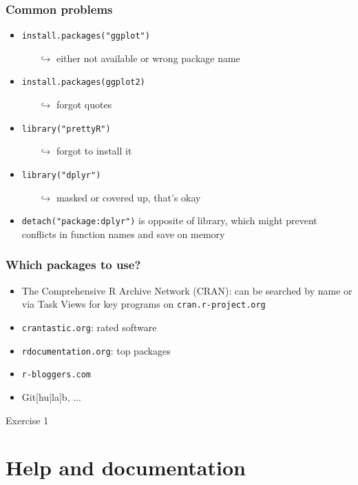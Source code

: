 \documentclass[xcolor={svgnames},10pt,
handout
]{beamer}
\begin{document}
\begin{frame}[fragile]
\frametitle{Common problems}
\begin{itemize}
\item \lstinline|install.packages("ggplot")|
	\begin{itemize}
	\item[$\hookrightarrow$] either not available or wrong package name 
	\end{itemize}
\item \lstinline|install.packages(ggplot2)|
	\begin{itemize}
	\item[$\hookrightarrow$] forgot quotes
	\end{itemize}
\item \lstinline|library("prettyR")|
	\begin{itemize}
	\item[$\hookrightarrow$] forgot to install it
	\end{itemize}
\item \lstinline|library("dplyr")|
	\begin{itemize}
	\item[$\hookrightarrow$] masked or covered up, that's okay
	\end{itemize}
\item \lstinline|detach("package:dplyr")| is opposite of library, which might prevent conflicts in function names and save on memory
\end{itemize}
\end{frame}

\begin{frame}
\frametitle{Which packages to use?}
\begin{itemize}
\item The Comprehensive R Archive Network (CRAN): can be searched by name or via Task Views for key programs on \texttt{cran.r-project.org}
\item \texttt{crantastic.org}: rated software
\item \texttt{rdocumentation.org}: top packages
\item \texttt{r-bloggers.com}
\item Git[hu|la]b, ...
\end{itemize}
\end{frame}

\begin{frame}[standout]
Exercise 1
\end{frame}
\section{Help and documentation}
\end{document}
